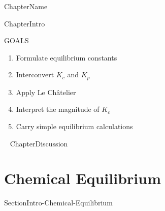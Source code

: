 \documentclass[main.tex]{subfiles}
\newcommand\chapterlabel{Ch-equilibrium}\setcounter{figurenewcounter}{0}\setcounter{tablenewcounter}{0}\setcounter{formulanewcounter}{0}
\begin{document}
  
   {ChapterName}


      \begin{marginfigure}
\end{marginfigure}
   {ChapterIntro}




\begin{marginfigure}%
\begin{mytcbox}{GOALS}
\begin{enumerate}[label=\protect\circled{\color{white}\arabic*}]
\item Formulate equilibrium constants
\item Interconvert $K_c$ and $K_p$
\item Apply Le Ch\^{a}telier
\item Interpret the magnitude of $K_c$
\item Carry simple equilibrium calculations
\end{enumerate}
\end{mytcbox}
\vspace{1cm}
\begin{tcolorbox}[enhanced,colback=red!5!white,colframe=black!50!red,boxrule=1pt,
  arc=0pt,outer arc=0pt,drop heavy lifted shadow]
\faGears\ 
  {ChapterDiscussion}


\end{tcolorbox}
\end{marginfigure}%

\section{Chemical Equilibrium} {SectionIntro-Chemical-Equilibrium}
\end{document}
